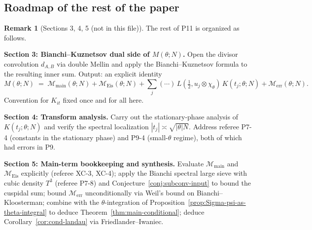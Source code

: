 \documentclass[11pt]{article}
\theoremstyle{definition}
\newtheorem{remark}[theorem]{Remark}
\begin{document}
\subsection{Roadmap of the rest of the paper}\label{ssec:typeII-roadmap}

\begin{remark}[Sections 3, 4, 5 (not in this file)]\label{rmk:roadmap-out}
The rest of P11 is organized as follows.

\medskip
\noindent\textbf{Section 3: Bianchi--Kuznetsov dual side of $M(\theta;N)$.} Open the divisor convolution $d_{A,B}$ via double Mellin and apply the Bianchi--Kuznetsov formula \cite{LG, motohashi-bianchi} to the resulting inner sum. Output: an explicit identity
\[
M(\theta;N)\;=\;\mathcal M_{\mathrm{main}}(\theta;N)+\mathcal M_{\mathrm{Eis}}(\theta;N)+\sum_j(\cdots)\,L(\tfrac12,u_j\otimes\chi_\theta)\,K(t_j;\theta;N)+\mathcal M_{\mathrm{err}}(\theta;N).
\]
Convention for $K_{it}$ fixed once and for all here.

\medskip
\noindent\textbf{Section 4: Transform analysis.} Carry out the stationary-phase analysis of $K(t_j;\theta;N)$ and verify the spectral localization $|t_j|\asymp\sqrt{|\theta|N}$. Address referee P7-4 (constants in the stationary phase) and P9-4 (small-$\theta$ regime), both of which had errors in P9.

\medskip
\noindent\textbf{Section 5: Main-term bookkeeping and synthesis.} Evaluate $\mathcal M_{\mathrm{main}}$ and $\mathcal M_{\mathrm{Eis}}$ explicitly (referee XC-3, XC-4); apply the Bianchi spectral large sieve with cubic density $T^3$ (referee P7-8) and Conjecture~\ref{conj:subconv-input} to bound the cuspidal sum; bound $\mathcal M_{\mathrm{err}}$ unconditionally via Weil's bound on Bianchi--Kloosterman; combine with the $\theta$-integration of Proposition~\ref{prop:Sigma-psi-as-theta-integral} to deduce Theorem~\ref{thm:main-conditional}; deduce Corollary~\ref{cor:cond-landau} via Friedlander--Iwaniec.
\end{remark}
\end{document}
